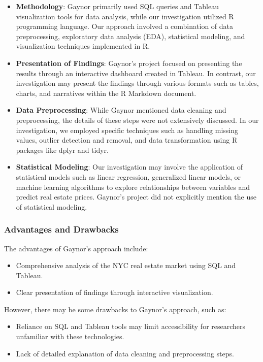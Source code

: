 \documentclass[
]{article}
\providecommand{\tightlist}{%
  \setlength{\itemsep}{0pt}\setlength{\parskip}{0pt}}
\begin{document}
\begin{itemize}
\item
  \textbf{Methodology}: Gaynor primarily used SQL queries and Tableau
  visualization tools for data analysis, while our investigation
  utilized R programming language. Our approach involved a combination
  of data preprocessing, exploratory data analysis (EDA), statistical
  modeling, and visualization techniques implemented in R.
\item
  \textbf{Presentation of Findings}: Gaynor's project focused on
  presenting the results through an interactive dashboard created in
  Tableau. In contrast, our investigation may present the findings
  through various formats such as tables, charts, and narratives within
  the R Markdown document.
\item
  \textbf{Data Preprocessing}: While Gaynor mentioned data cleaning and
  preprocessing, the details of these steps were not extensively
  discussed. In our investigation, we employed specific techniques such
  as handling missing values, outlier detection and removal, and data
  transformation using R packages like dplyr and tidyr.
\item
  \textbf{Statistical Modeling}: Our investigation may involve the
  application of statistical models such as linear regression,
  generalized linear models, or machine learning algorithms to explore
  relationships between variables and predict real estate prices.
  Gaynor's project did not explicitly mention the use of statistical
  modeling.
\end{itemize}

\hypertarget{advantages-and-drawbacks}{%
\subsubsection{Advantages and
Drawbacks}\label{advantages-and-drawbacks}}

The advantages of Gaynor's approach include:

\begin{itemize}
\tightlist
\item
  Comprehensive analysis of the NYC real estate market using SQL and
  Tableau.
\item
  Clear presentation of findings through interactive visualization.
\end{itemize}

However, there may be some drawbacks to Gaynor's approach, such as:

\begin{itemize}
\tightlist
\item
  Reliance on SQL and Tableau tools may limit accessibility for
  researchers unfamiliar with these technologies.
\item
  Lack of detailed explanation of data cleaning and preprocessing steps.
\end{itemize}
\end{document}
